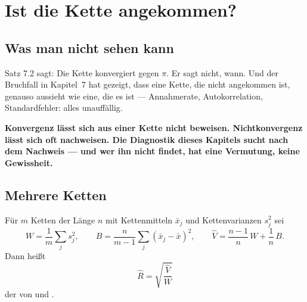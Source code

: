 \chapter{Ist die Kette angekommen?}

\section{Was man nicht sehen kann}

\begin{merksatz}
Satz 7.2 sagt: Die Kette konvergiert gegen $\pi$. Er sagt nicht, wann. Und der Bruchfall in Kapitel~7 hat gezeigt, dass eine Kette, die nicht angekommen ist, genauso aussieht wie eine, die es ist --- Annahmerate, Autokorrelation, Standardfehler: alles unauffällig.

\begin{center}
\begin{minipage}{0.9\textwidth}
\textbf{Konvergenz lässt sich aus einer Kette nicht beweisen. Nichtkonvergenz lässt sich oft nachweisen. Die Diagnostik dieses Kapitels sucht nach dem Nachweis --- und wer ihn nicht findet, hat eine Vermutung, keine Gewissheit.}
\end{minipage}
\end{center}

\begin{center}
\begin{minipage}{0.88\textwidth}
\end{minipage}
\end{center}
\end{merksatz}

\section{Mehrere Ketten}

\begin{definition}
Für $m$ Ketten der Länge $n$ mit Kettenmitteln $\bar x_j$ und Kettenvarianzen $s_j^2$ sei
\[ W = \frac1m\sum_j s_j^2, \qquad B = \frac{n}{m-1}\sum_j (\bar x_j - \bar x)^2, \qquad \hat V = \frac{n-1}{n}\,W + \frac1n\,B . \]
Dann heißt
\[ \hat R = \sqrt{\frac{\hat V}{W}} \]
der  von  und .
\end{definition}

